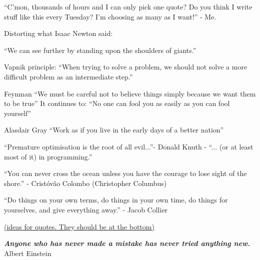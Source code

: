 ``C'mon, thousands of hours and I can only pick one quote? Do you think I write stuff like this every Tuesday? I'm choosing as many as I want!'' - Me.


Distorting what Isaac Newton said:

``We can see further by standing upon the shoulders of giants.''

Vapnik principle:
``When trying to solve a problem, we should not solve a more difficult problem as an intermediate step.''

Feynman
``We must be careful not to believe things simply because we want them to be true''
It continues to: ``No one can fool you as easily as you can fool yourself''

Alasdair Gray
``Work as if you live in the early days of a better nation''


``Premature optimisation is the root of all evil...''- Donald Knuth - ``... (or at least most of it) in programming.''


``You can never cross the ocean unless you have the courage to lose sight of the shore.'' - Cristóvão Colombo (Christopher Columbus)


``Do things on your own terms, do things in your own time, do things for yourselves, and give everything away.'' - Jacob Collier



\ul{(ideas for quotes. They should be at the bottom)}


\thispagestyle{empty}
\hbox{} \vfill
\begin{flushright}
\small \textit{\textbf{Anyone who has never made a mistake has never tried anything new.}}
\\ \vspace{2mm}  
\scriptsize Albert Einstein
\end{flushright}

\clearpage
\thispagestyle{empty}
\cleardoublepage

